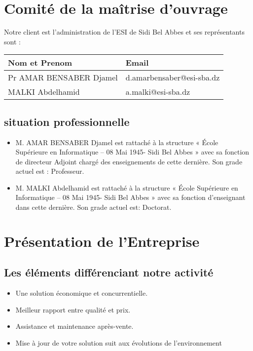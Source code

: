 \documentclass[11pt,fleqn]{book} %
\begin{document}
\section{Comité de la maîtrise d’ouvrage}
Notre client est l’administration de l’ESI de Sidi Bel Abbes et ses représentants sont :
\begin{center}
\begin{tabularx}{0.8\textwidth} { | p{5cm} | >{\raggedright\arraybackslash}X |  }
   \hline
 Nom et Prenom & Email  \\
 \hline
 Pr AMAR BENSABER Djamel  &  d.amarbensaber@esi-sba.dz  \\
  \hline
 MALKI Abdelhamid  & a.malki@esi-sba.dz   \\
  \hline
  \end{tabularx}
    \label{tbl:nicetablelesstable}
\end{center}
\subsection{situation professionnelle}
\begin{itemize}
    \item  M. AMAR BENSABER Djamel est rattaché à la structure « École Supérieure en Informatique – 08 Mai 1945- Sidi Bel Abbes » avec sa fonction de directeur Adjoint chargé des enseignements de cette dernière. Son grade actuel est : Professeur. 
    \item M. MALKI Abdelhamid est rattaché à la structure « École Supérieure en Informatique – 08 Mai 1945- Sidi Bel Abbes » avec sa fonction d’enseignant dans cette dernière. Son grade actuel est: Doctorat. 
\end{itemize}

\section{Présentation de l’Entreprise}
\subsection{ Les éléments différenciant notre activité}
\begin{itemize}
    \item Une solution économique et concurrentielle.
     \item Meilleur rapport entre qualité et prix.
     \item Assistance et maintenance après-vente. 
     \item Mise à jour de votre solution suit aux évolutions de l’environnement
\end{itemize}
\end{document}
